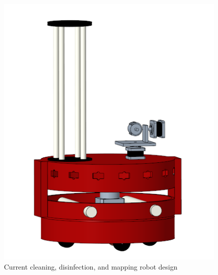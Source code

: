 \documentclass[10pt,a4paper]{article}
\author{Brian Lauer}
\begin{document}
\begin{figure}
\centering
\includegraphics[scale=0.5]{figs/img/frontViewScreenshotB}
\caption{Current cleaning, disinfection, and mapping robot design}
\label{camRobot}
\end{figure}
\end{document}
